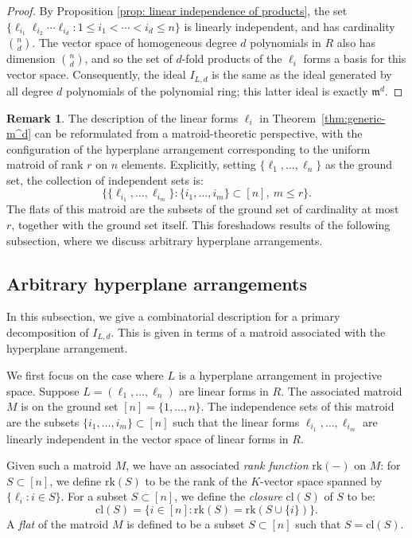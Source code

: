 \documentclass [a4paper,reqno, 11pt]{amsart}
\theoremstyle{plain}
\theoremstyle{plain}
\theoremstyle{plain}
\theoremstyle{plain}
\theoremstyle{definition}
\theoremstyle{definition}
\theoremstyle{definition}
\newtheorem{remark}[theorem]{Remark}
\theoremstyle{definition}
\theoremstyle{definition}
\theoremstyle{definition}
\begin{document}
\begin{proof}
    By Proposition \ref{prop: linear independence of products}, the set \(\{\ell_{i_1}\ell_{i_2}\cdots\ell_{i_d}:1\leq i_1<\cdots<i_d\leq n\}\) is linearly independent, and has cardinality $\binom{n}{d}$. The vector space of homogeneous degree $d$ polynomials in $R$ also has dimension $\binom{n}{d}$, and so the set of $d$-fold products of the $\ell_i$ forms a basis for this vector space.
    Consequently, the ideal $I_{L,d}$ is the same as the ideal generated by all degree $d$ polynomials of the polynomial ring; this latter ideal is exactly $\mathfrak{m}^d$.
\end{proof}

\begin{remark}\label{rmk:uniform matroid}
The description of the linear forms \(\ell_i\) in Theorem~\ref{thm:generic-m^d} can be reformulated from a matroid-theoretic perspective, with the configuration of the hyperplane arrangement corresponding to the uniform matroid of rank \(r\) on \(n\) elements. Explicitly, setting \(\{\ell_1,\ldots,\ell_n\}\) as the ground set, the collection of independent sets is:
\[\{\{\ell_{i_1},\ldots,\ell_{i_m}\}:\{i_1,\ldots,i_m\}\subset[n], \ m\le r\}.\]
The flats of this matroid are the subsets of the ground set of cardinality at most $r$, together with the ground set itself. This foreshadows results of the following subsection, where we discuss arbitrary hyperplane arrangements.
\end{remark}


\subsection{Arbitrary hyperplane arrangements}\label{subsec:affine}

In this subsection, we give a combinatorial description for a primary decomposition of $I_{L,d}$. This is given in terms of a matroid associated with the hyperplane arrangement.


We first focus on the case where $L$ is a hyperplane arrangement in projective space.
Suppose $L=(\ell_1,\ldots,\ell_n)$ are linear forms in $R$.
The associated matroid $M$ is on the ground set $[n]=\{1,\ldots,n\}$. The independence sets of this matroid are the subsets $\{i_1,\ldots,i_m\}\subset[n]$ such that the linear forms $\ell_{i_1},\ldots,\ell_{i_m}$ are linearly independent in the vector space of linear forms in $R$.

Given such a matroid $M$, we have an associated \emph{rank function} $\mathrm{rk}(-)$ on $M$: for $S\subset[n]$, we define $\mathrm{rk}(S)$ to be the rank of the $K$-vector space spanned by $\{\ell_i:i\in S\}$. For a subset $S\subset[n]$, we define the \emph{closure} $\mathrm{cl}(S)$ of $S$ to be:
\[\mathrm{cl}(S)=\{i\in[n]:\mathrm{rk}(S)=\mathrm{rk}(S\cup\{i\})\}.\]
A \emph{flat} of the matroid $M$ is defined to be a subset $S\subset[n]$ such that $S=\mathrm{cl}(S)$.
\end{document}
